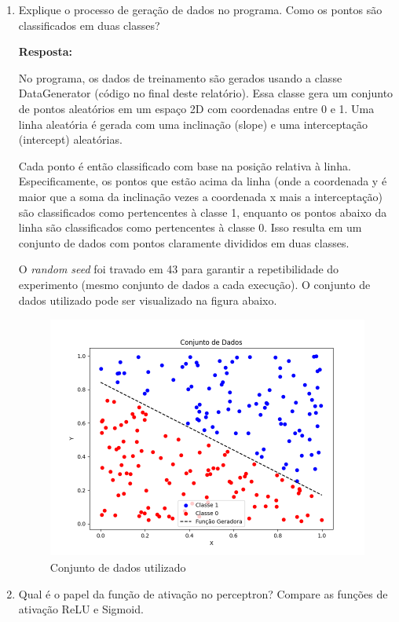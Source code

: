 \documentclass[12 pt]{article}
\begin{document}
\begin{enumerate}
    \item Explique o processo de geração de dados no programa. Como os pontos são classificados em duas classes? \par

    \textbf{Resposta:} \par

    No programa, os dados de treinamento são gerados usando a classe DataGenerator (código no final deste relatório). Essa classe gera um conjunto de pontos aleatórios em um espaço 2D com coordenadas entre 0 e 1. Uma linha aleatória é gerada com uma inclinação (slope) e uma interceptação (intercept) aleatórias.

    Cada ponto é então classificado com base na posição relativa à linha. Especificamente, os pontos que estão acima da linha (onde a coordenada y é maior que a soma da inclinação vezes a coordenada x mais a interceptação) são classificados como pertencentes à classe 1, enquanto os pontos abaixo da linha são classificados como pertencentes à classe 0. Isso resulta em um conjunto de dados com pontos claramente divididos em duas classes.

    O \textit{random seed} foi travado em 43 para garantir a repetibilidade do experimento (mesmo conjunto de dados a cada execução). O conjunto de dados utilizado pode ser visualizado na figura abaixo.

    \begin{figure}[H]
        \caption{Conjunto de dados utilizado}
           \centering
           \includegraphics[height=8cm]{fig/Figure_1.png}
    \end{figure}
    
    \item Qual é o papel da função de ativação no perceptron? Compare as funções de ativação ReLU e Sigmoid.\par


\end{enumerate}
\end{document}
